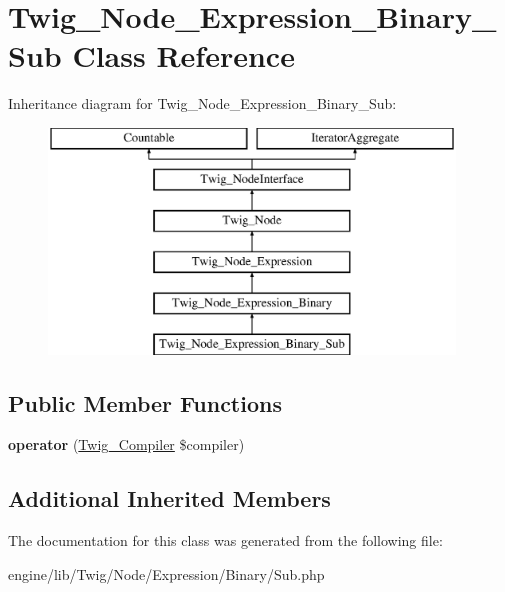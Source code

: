 \hypertarget{class_twig___node___expression___binary___sub}{}\section{Twig\+\_\+\+Node\+\_\+\+Expression\+\_\+\+Binary\+\_\+\+Sub Class Reference}
\label{class_twig___node___expression___binary___sub}
Inheritance diagram for Twig\+\_\+\+Node\+\_\+\+Expression\+\_\+\+Binary\+\_\+\+Sub\+:\begin{figure}[H]
\begin{center}
\leavevmode
\includegraphics[height=6.000000cm]{class_twig___node___expression___binary___sub}
\end{center}
\end{figure}
\subsection*{Public Member Functions}
\begin{DoxyCompactItemize}
\item 
\hypertarget{class_twig___node___expression___binary___sub_af77318ec88d5f8a508684970a150b670}{}{\bfseries operator} (\hyperlink{class_twig___compiler}{Twig\+\_\+\+Compiler} \$compiler)\label{class_twig___node___expression___binary___sub_af77318ec88d5f8a508684970a150b670}

\end{DoxyCompactItemize}
\subsection*{Additional Inherited Members}


The documentation for this class was generated from the following file\+:\begin{DoxyCompactItemize}
\item 
engine/lib/\+Twig/\+Node/\+Expression/\+Binary/Sub.\+php\end{DoxyCompactItemize}

